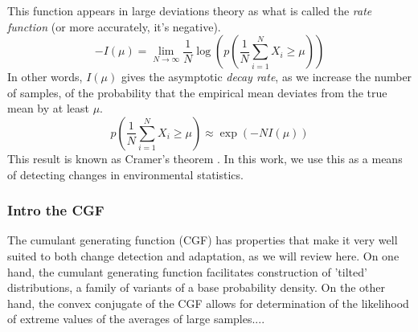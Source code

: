\documentclass[10pt]{article}      %
\begin{document}
This function appears in large deviations theory \cite{dembo2009large,touchette_basic_2012} as what is called the \textit{rate function} (or more accurately, it's negative).
\begin{equation}
  -I(\mu) = \lim_{N \to \infty} \frac{1}{N} \log \left( p \left(\frac{1}{N} \sum_{i=1}^N X_i \ge \mu \right) \right)
\end{equation}
In other words, $I(\mu)$ gives the asymptotic \textit{decay rate}, as we increase the number of samples, of the probability that the empirical mean deviates from the true mean by at least $\mu$.
\begin{equation}
  p \left( \frac{1}{N} \sum_{i=1}^N X_i \ge \mu \right) \approx \exp(-N I(\mu))
\end{equation}
This result is known as Cramer's theorem \cite{dembo2009large}.
In this work, we use this as a means of detecting changes in environmental statistics. 


\subsubsection{Intro the CGF}

The cumulant generating function (CGF) has properties that make it very well suited to both change detection and adaptation, as we will review here.
On one hand, the cumulant generating function facilitates construction of 'tilted' distributions, a family of variants of a base probability density.
On the other hand, the convex conjugate of the CGF allows for determination of the likelihood of extreme values of the averages of large samples....








\end{document}
